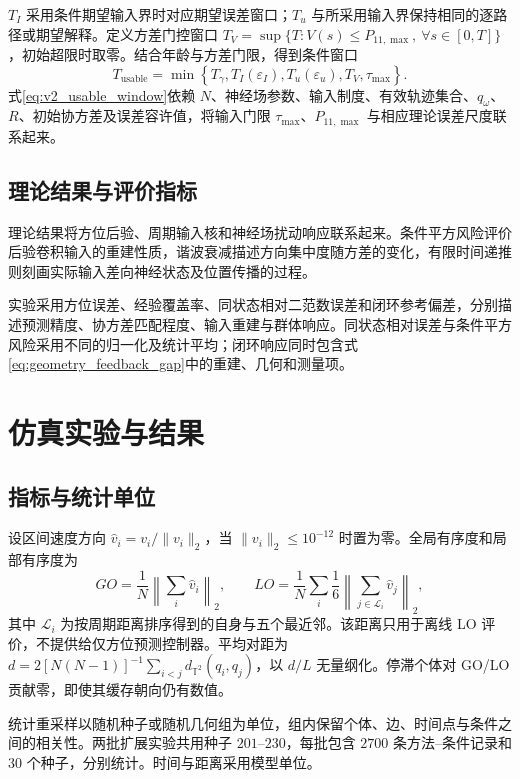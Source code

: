 \documentclass[UTF8,fontset=windows,11pt]{ctexart}
\begin{document}
$T_I$ 采用条件期望输入界时对应期望误差窗口；$T_u$ 与所采用输入界保持相同的逐路径或期望解释。定义方差门控窗口 $T_V=\sup\{T:V(s)\le P_{11,\max},\ \forall s\in[0,T]\}$，初始超限时取零。结合年龄与方差门限，得到条件窗口
\begin{equation}
 T_{\mathrm{usable}}
 =\min\left\{T_\gamma,
 T_I(\varepsilon_I),
 T_u(\varepsilon_u),T_V,
 \tau_{\max}\right\}.
 \label{eq:v2_usable_window}
\end{equation}
式\eqref{eq:v2_usable_window}依赖 $N$、神经场参数、输入制度、有效轨迹集合、$q_\omega$、$R$、初始协方差及误差容许值，将输入门限 $\tau_{\max}$、$P_{11,\max}$ 与相应理论误差尺度联系起来。

\subsection{理论结果与评价指标}

理论结果将方位后验、周期输入核和神经场扰动响应联系起来。条件平方风险评价后验卷积输入的重建性质，谐波衰减描述方向集中度随方差的变化，有限时间递推则刻画实际输入差向神经状态及位置传播的过程。

实验采用方位误差、经验覆盖率、同状态相对二范数误差和闭环参考偏差，分别描述预测精度、协方差匹配程度、输入重建与群体响应。同状态相对误差与条件平方风险采用不同的归一化及统计平均；闭环响应同时包含式\eqref{eq:geometry_feedback_gap}中的重建、几何和测量项。

\section{仿真实验与结果}

\subsection{指标与统计单位}
设区间速度方向 $\widehat v_i=v_i/\|v_i\|_2$，当 $\|v_i\|_2\le10^{-12}$ 时置为零。全局有序度和局部有序度为
\begin{equation}
GO=\frac1N\left\|\sum_i\widehat v_i\right\|_2,\qquad
LO=\frac1N\sum_i\frac1{6}\left\|\sum_{j\in\mathcal L_i}\widehat v_j\right\|_2,
\end{equation}
其中 $\mathcal L_i$ 为按周期距离排序得到的自身与五个最近邻。该距离只用于离线 LO 评价，不提供给仅方位预测控制器。平均对距为 $d=2[N(N-1)]^{-1}\sum_{i<j}d_{\mathbb T^2}(q_i,q_j)$，以 $d/L$ 无量纲化。停滞个体对 GO/LO 贡献零，即使其缓存朝向仍有数值。

统计重采样以随机种子或随机几何组为单位，组内保留个体、边、时间点与条件之间的相关性。两批扩展实验共用种子 $201$--$230$，每批包含 $2700$ 条方法--条件记录和 $30$ 个种子，分别统计。时间与距离采用模型单位。
\end{document}
